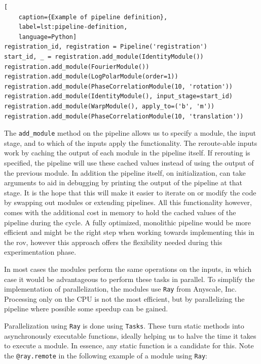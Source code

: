 \begin{lstlisting}[
    caption={Example of pipeline definition},
    label=lst:pipeline-definition,
    language=Python]
registration_id, registration = Pipeline('registration')
start_id, _ = registration.add_module(IdentityModule())
registration.add_module(FourierModule())
registration.add_module(LogPolarModule(order=1))
registration.add_module(PhaseCorrelationModule(10, 'rotation'))
registration.add_module(IdentityModule(), input_stage=start_id)
registration.add_module(WarpModule(), apply_to=('b', 'm'))
registration.add_module(PhaseCorrelationModule(10, 'translation'))
\end{lstlisting}

The \lstinline{add_module} method on the pipeline allows us to specify a module, the input stage, and to which of the inputs apply the functionality. The reroute-able inputs work by caching the output of each module in the pipeline itself. If rerouting is specified, the pipeline will use these cached values instead of using the output of the previous module. In addition the pipeline itself, on initialization, can take arguments to aid in debugging by printing the output of the pipeline at that stage. It is the hope that this will make it easier to iterate on or modify the code by swapping out modules or extending pipelines. All this functionality however, comes with the additional cost in memory to hold the cached values of the pipeline during the cycle. A fully optimized, monolithic pipeline would be more efficient and might be the right step when working towards implementing this in the \acrshort{rov}, however this approach offers the flexibility needed during this experimentation phase.

In most cases the modules perform the same operations on the inputs, in which case it would be advantageous to perform these tasks in parallel. To simplify the implementation of parallelization, the modules use \texttt{Ray} from Anyscale, Inc. Processing only on the CPU is not the most efficient, but by parallelizing the pipeline where possible some speedup can be gained.

Parallelization using \texttt{Ray} is done using \texttt{Tasks}. These turn static methods into asynchronously executable functions, ideally helping us to halve the time it takes to execute a module. In essence, any static function is a candidate for this. Note the \lstinline{@ray.remote} in the following example of a module using \texttt{Ray}:

